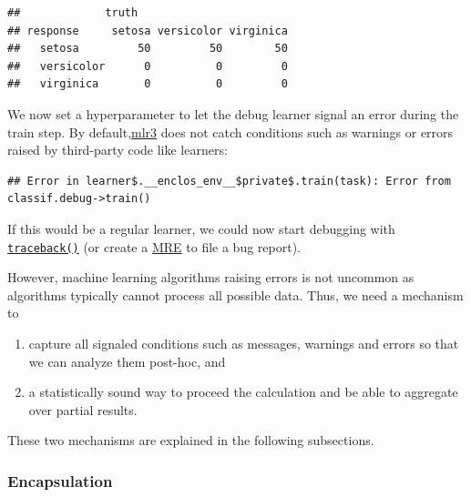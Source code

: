 \documentclass[]{article}
\newenvironment{Shaded}{\begin{snugshade}}{\end{snugshade}}
\newcommand{\DataTypeTok}[1]{\textcolor[rgb]{0.13,0.29,0.53}{#1}}
\newcommand{\DecValTok}[1]{\textcolor[rgb]{0.00,0.00,0.81}{#1}}
\newcommand{\KeywordTok}[1]{\textcolor[rgb]{0.13,0.29,0.53}{\textbf{#1}}}
\newcommand{\NormalTok}[1]{#1}
\newcommand{\OperatorTok}[1]{\textcolor[rgb]{0.81,0.36,0.00}{\textbf{#1}}}
\newcommand{\StringTok}[1]{\textcolor[rgb]{0.31,0.60,0.02}{#1}}
\providecommand{\tightlist}{%
  \setlength{\itemsep}{0pt}\setlength{\parskip}{0pt}}
\renewenvironment{Shaded} {\begin{snugshade}\small} {\end{snugshade}}
\begin{document}
\begin{verbatim}
##             truth
## response     setosa versicolor virginica
##   setosa         50         50        50
##   versicolor      0          0         0
##   virginica       0          0         0
\end{verbatim}

We now set a hyperparameter to let the debug learner signal an error during the train step.
By default,\href{https://github.com/mlr-org/mlr3}{mlr3} does not catch conditions such as warnings or errors raised by third-party code like learners:

\begin{Shaded}
\end{Shaded}

\begin{verbatim}
## Error in learner$.__enclos_env__$private$.train(task): Error from classif.debug->train()
\end{verbatim}

If this would be a regular learner, we could now start debugging with \href{https://www.rdocumentation.org/packages/base/topics/traceback}{\texttt{traceback()}} (or create a \href{https://stackoverflow.com/help/minimal-reproducible-example}{MRE} to file a bug report).

However, machine learning algorithms raising errors is not uncommon as algorithms typically cannot process all possible data.
Thus, we need a mechanism to

\begin{enumerate}
\def\labelenumi{\arabic{enumi}.}
\tightlist
\item
  capture all signaled conditions such as messages, warnings and errors so that we can analyze them post-hoc, and
\item
  a statistically sound way to proceed the calculation and be able to aggregate over partial results.
\end{enumerate}

These two mechanisms are explained in the following subsections.

\hypertarget{encapsulation}{%
\subsubsection{Encapsulation}\label{encapsulation}}
\end{document}
